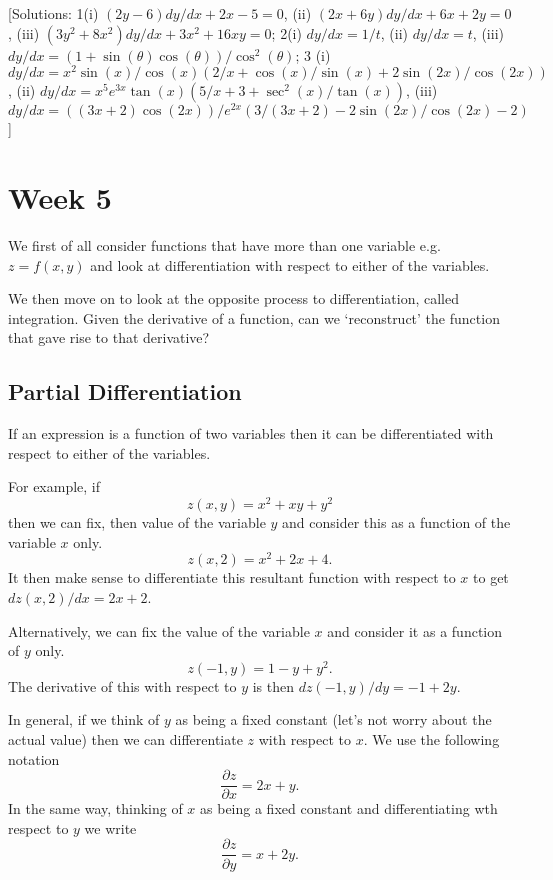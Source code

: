 \documentclass[
  11pt,
  oneside]{book}
\newcommand{\slide}{}
\theoremstyle{definition}
\theoremstyle{definition}
\theoremstyle{definition}
\theoremstyle{definition}
\theoremstyle{remark}
\begin{document}
{[}Solutions: 1(i) \((2y-6)dy/dx+2x-5=0\), (ii) \((2x+6y)dy/dx+6x+2y=0\), (iii) \((3y^2+8x^2)dy/dx+3x^2+16xy=0\); 2(i) \(dy/dx = 1/t\), (ii) \(dy/dx = t\), (iii) \(dy/dx = (1+\sin(\theta)\cos(\theta))/\cos^2(\theta)\); 3 (i) \(dy/dx=x^2\sin(x)/\cos(x)\left(2/x+\cos(x)/\sin(x)+2\sin(2x)/\cos(2x)\right)\), (ii) \(dy/dx = x^5e^{3x}\tan(x)\left(5/x+3+\sec^2(x)/\tan(x)\right)\), (iii) \(dy/dx = ((3x+2)\cos(2x))/e^{2x}\left(3/(3x+2)-2\sin(2x)/\cos(2x)-2\right)\){]}

\chapter{Week 5}\label{week-five}

We first of all consider functions that have more than one variable e.g.~\(z = f(x,y)\) and look at differentiation with respect to either of the variables.

We then move on to look at the opposite process to differentiation, called integration. Given the derivative of a function, can we `reconstruct' the function that gave rise to that derivative?

\slide

\section{Partial Differentiation}\label{partial-differentiation}

If an expression is a function of two variables then it can be differentiated with respect to either of the variables.

For example, if
\[
z(x,y) = x^2+xy+y^2
\]
then we can fix, then value of the variable \(y\) and consider this as a function of the variable \(x\) only.
\[
z(x,2) = x^2 + 2x + 4.
\]
It then make sense to differentiate this resultant function with respect to \(x\) to get \(dz(x,2)/dx = 2x+2\).

Alternatively, we can fix the value of the variable \(x\) and consider it as a function of \(y\) only.
\[
z(-1,y) = 1-y+y^2.
\]
The derivative of this with respect to \(y\) is then \(dz(-1,y)/dy = -1+2y\).

\slide

In general, if we think of \(y\) as being a fixed constant (let's not worry about the actual value) then we can differentiate \(z\) with respect to \(x\). We use the following notation
\[
\frac{\partial z}{\partial x} = 2x+y.
\]
In the same way, thinking of \(x\) as being a fixed constant and differentiating wth respect to \(y\) we write
\[
\frac{\partial z}{\partial y} = x + 2y.
\]
\end{document}
